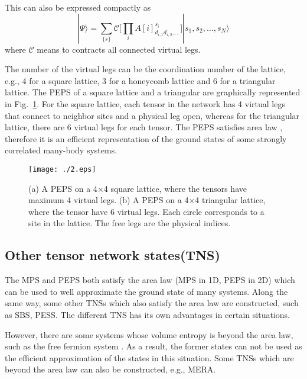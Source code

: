 \documentclass[preprint,3p,times,preprint,showpacs,amsmath,superscriptaddress,floatfix]{elsarticle}
\begin{document}
This can also be expressed compactly as
\begin{equation}\label{MPSPsi2}
|\Psi\rangle=\sum_{\{s\}} \mathcal{C}\Big[\prod_iA[i]^{s_i}_{d_{i,1} d_{i,2},\dots}\Big]|{s_1,s_2,\dots,s_N}\rangle
\end{equation}
where $\mathcal{C}$ means to contracts all connected virtual legs.

The number of the virtual legs can be the coordination number of the lattice, e.g., 4 for a square lattice, 3 for a honeycomb lattice and 6 for a triangular lattice.  The PEPS of a square lattice and a triangular are graphically represented in Fig.~\ref{graphicalPEPS}. For the square lattice, each tensor in the network has 4 virtual legs that connect to neighbor sites and a physical leg open, whereas for the triangular lattice, there are 6 virtual legs for each tensor.
The PEPS satisfies area law \cite{Eisert10}, therefore it is an efficient representation of the
ground states of some strongly correlated many-body systems.

\begin{figure} [!hbp]
		\begin{center}
       \texttt{[image: ./2.eps]}
		\caption{(a) A PEPS on a 4$\times$4 square lattice, where the tensors have maximum 4 virtual legs.
(b) A PEPS on a 4$\times$4 triangular lattice, where the tensor have 6 virtual legs. Each circle corresponds to a site in the lattice.
The free legs are the physical indices.
}\label{graphicalPEPS}
		\end{center}
\end{figure}



\subsection{Other tensor network states(TNS)}

The MPS and PEPS both satisfy the area law (MPS in 1D, PEPS in 2D) which can be used to well approximate the ground state of many systems. Along the same way, some other TNSs which also satisfy the area law are constructed, such as SBS\cite{Cirac2010}, PESS\cite{xie2014}. The different TNS has its own advantages in certain situations.

However, there are some systems whose volume entropy is beyond the area law, such as the free fermion system \cite{Wolf}. As a result, the former states can not be used as the efficient approximation of the states in this situation. Some TNSs which are beyond the area law can also be constructed, e.g., MERA\cite{Vidal2008}.
\end{document}
